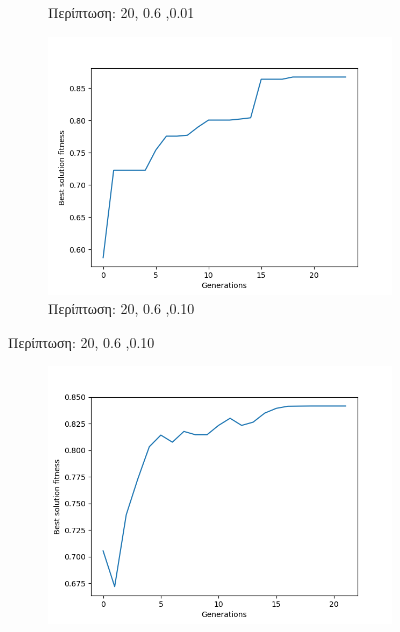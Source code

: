 \documentclass[12pt,a4paper]{article}
\begin{document}
\begin{enumerate}[a)]
\begin{figure}[H]
\begin{subfigure}[h]{0.7\textwidth}
                         \caption*{Περίπτωση: 20, 0.6 ,0.01}
                     \end{subfigure}
                     \hfill
                     \begin{subfigure}[h]{0.7\textwidth}
                         \centering
                         \includegraphics[width=\textwidth]{images/3s.png}
                         \caption*{Περίπτωση: 20, 0.6 ,0.10}
                     \end{subfigure}
                 \end{figure}
                 \begin{figure}[H]
                     \centering
                     \begin{subfigure}[h]{0.7\textwidth}
                         \centering
                         \includegraphics[width=\textwidth]{images/4s.png}

\end{subfigure}
\end{figure}
\end{enumerate}
\end{document}
